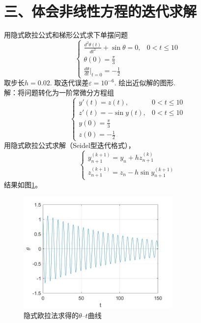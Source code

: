 \documentclass[10pt,a4paper]{article}
\begin{document}
\section*{三、体会非线性方程的迭代求解}
用隐式欧拉公式和梯形公式求下单摆问题
\[
\left\{\begin{array}{ll}
\frac{d^2\theta(t)}{dt^2}+\sin\theta=0,&0<t\leq10\\
\theta(0)=\frac{\pi}{3}\\
\frac{d\theta}{dt}|_{t=0}=-\frac{1}{2}
\end{array}\right.
\]
取步长$h=0.02$. 取迭代误差$\varepsilon=10^{-6}$. 绘出近似解的图形.\\
解：将问题转化为一阶常微分方程组
\[
\left\{\begin{array}{ll}
y'(t)=z(t),&0<t\leq10\\
z'(t)=-\sin y(t),&0<t\leq10\\
y(0)=\frac{\pi}{3}\\
z(0)=-\frac{1}{2}
\end{array}\right.
\]
用隐式欧拉公式求解（Seidel型迭代格式），
\[
\left\{\begin{array}{l}
y_{n+1}^{(k+1)}=y_n+hz_{n+1}^{(k)}\\
z_{n+1}^{(k+1)}=z_n-h\sin y_{n+1}^{(k+1)}
\end{array}\right.
\]
结果如图\ref{3_1}。
\begin{figure}[h]
\centering
\includegraphics[width=8cm]{ImplEular_3.jpg}
\caption{隐式欧拉法求得的$\theta$--$t$曲线}\label{3_1}
\end{figure}
\end{document}
